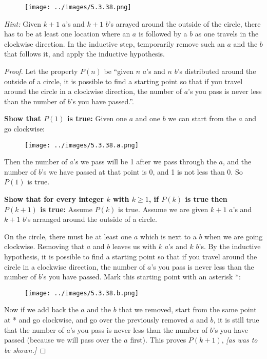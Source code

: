 \documentclass[14pt]{extarticle}
\begin{document}
\begin{figure}[ht!]
    \centering
    \texttt{[image: ../images/5.3.38.png]}
\end{figure}

{\it Hint:} Given $k + 1$ $a$’s and $k + 1$ $b$’s arrayed around the outside of the circle, there has to be at least one location where an $a$ is followed by a $b$ as one travels in the clockwise direction. In the inductive step, temporarily remove such an $a$ and the $b$ that follows it, and apply the inductive hypothesis.

\begin{proof}
    Let the property $P(n)$ be ``given $n$ $a$'s and $n$ $b$'s distributed around the outside of a circle, it is possible to find a starting point so that if you travel around the circle in a clockwise direction, the number of $a$'s you pass is never less than the number of $b$'s you have passed.''.

    {\bf Show that $P(1)$ is true:} Given one $a$ and one $b$ we can start from the $a$ and go clockwise:

    \begin{figure}[ht!]
        \centering
        \texttt{[image: ../images/5.3.38.a.png]}
    \end{figure}

    Then the number of $a$'s we pass will be 1 after we pass through the $a$, and the number of $b$'s we have passed at that point is 0, and 1 is not less than 0. So $P(1)$ is true.

        {\bf Show that for every integer $k$ with $k \geq 1$, if $P(k)$ is true then $P(k+1)$ is true:} Assume $P(k)$ is true. Assume we are given $k+1$ $a$'s and $k+1$ $b$'s arranged around the outside of a circle.

    On the circle, there must be at least one $a$ which is next to a $b$ when we are going clockwise. Removing that $a$ and $b$ leaves us with $k$ $a$'s and $k$ $b$'s. By the inductive hypothesis, it is possible to find a starting point so that if you travel around the circle in a clockwise direction, the number of $a$'s you pass is never less than the number of $b$'s you have passed. Mark this starting point with an asterisk *:

    \begin{figure}[ht!]
        \centering
        \texttt{[image: ../images/5.3.38.b.png]}
    \end{figure}

    Now if we add back the $a$ and the $b$ that we removed, start from the same point at * and go clockwise, and go over the previously removed $a$ and $b$, it is still true that the number of $a$'s you pass is never less than the number of $b$'s you have passed (because we will pass over the $a$ first). This proves $P(k+1)$, {\it [as was to be shown.]}
\end{proof}
\end{document}
